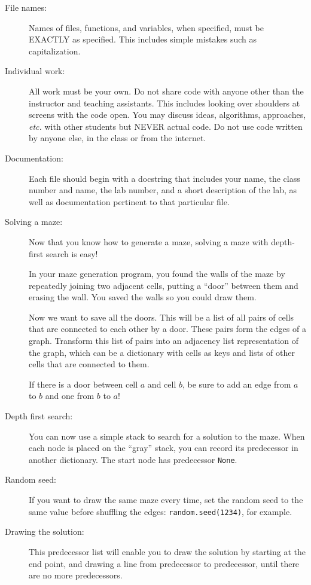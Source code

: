 \documentclass{article}
\begin{document}
\begin{description}

\item[File names:]  Names of files, functions, and variables, 
when specified,
must be EXACTLY as specified.  This includes simple mistakes such
as capitalization.

\item[Individual work:]  All work must be your own.  Do not share
code with anyone other than the instructor and teaching assistants.
This includes looking over shoulders at screens with the code open.
You may discuss ideas, algorithms, approaches, {\em etc.} with
other students but NEVER actual code.  Do not use code
written by anyone else, in the class or from the internet.

\item[Documentation:] Each file should begin with a docstring
that includes your name, the class number and name, the lab
number, and  
a short description of the lab, as well as documentation pertinent
to that particular file.

  
\item[Solving a maze:]  Now that you know how to generate a maze,
solving a maze with depth-first search is easy!

In your maze generation program, you found the walls of the maze
by repeatedly joining two adjacent cells, putting a ``door'' between
them and erasing the wall.  You saved the walls so you could draw 
them.

Now we want to save all the doors.  This will be a list of all pairs
of cells that are connected to each other by a door.  These
pairs form the edges of a graph.  Transform
this list of pairs into an adjacency list representation of the graph,
which can be a dictionary with cells as keys and lists of other
cells that are connected to them.

If there is a door between cell $a$ and cell $b$, be sure to 
add an edge from $a$ to $b$ and one from $b$ to $a$!

\item[Depth first search:]  You can now use a simple stack
to search for a solution to the maze.  When each node is
placed on the ``gray'' stack, you can record its predecessor
in another dictionary.  The start node has predecessor {\tt None}.

\item[Random seed:] If you want to draw the same maze
every time, set the random seed to the same value before
shuffling the edges:  {\tt random.seed(1234)}, for example. 
\item[Drawing the solution:]
This predecessor list will enable
you to draw the solution by starting at the end point, and drawing
a line from predecessor to predecessor, until there are no more
predecessors.


\end{description}
\end{document}
